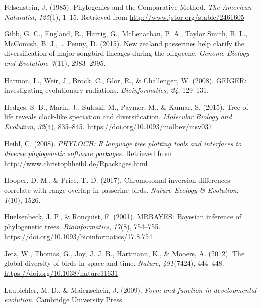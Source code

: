 \documentclass[
  english,
  man]{apa6}
\newlength{\cslhangindent}
\newlength{\cslentryspacingunit} %
\newenvironment{CSLReferences}[2] %
 {%
  \setlength{\parindent}{0pt}
  \ifodd #1
  \let\oldpar\par
  \def\par{\hangindent=\cslhangindent\oldpar}
  \fi
  \setlength{\parskip}{#2\cslentryspacingunit}
 }%
 {}
\begin{document}
\begin{CSLReferences}{1}{0}
\leavevmode{}%
Felsenstein, J. (1985). {Phylogenies and the Comparative Method}. \emph{The American Naturalist}, \emph{125}(1), 1--15. Retrieved from \url{http://www.jstor.org/stable/2461605}

\leavevmode{}%
Gibb, G. C., England, R., Hartig, G., McLenachan, P. A., Taylor Smith, B. L., McComish, B. J., \ldots{} Penny, D. (2015). New zealand passerines help clarify the diversification of major songbird lineages during the oligocene. \emph{{Genome Biology and Evolution}}, \emph{7}(11), 2983--2995.

\leavevmode{}%
Harmon, L., Weir, J., Brock, C., Glor, R., \& Challenger, W. (2008). {GEIGER: investigating evolutionary radiations}. \emph{Bioinformatics}, \emph{24}, 129--131.

\leavevmode{}%
Hedges, S. B., Marin, J., Suleski, M., Paymer, M., \& Kumar, S. (2015). {Tree of life reveals clock-like speciation and diversification}. \emph{{Molecular Biology and Evolution}}, \emph{32}(4), 835--845. \url{https://doi.org/10.1093/molbev/msv037}

\leavevmode{}%
Heibl, C. (2008). \emph{PHYLOCH: R language tree plotting tools and interfaces to diverse phylogenetic software packages.} Retrieved from \url{http://www.christophheibl.de/Rpackages.html}

\leavevmode{}%
Hooper, D. M., \& Price, T. D. (2017). Chromosomal inversion differences correlate with range overlap in passerine birds. \emph{Nature Ecology \& Evolution}, \emph{1}(10), 1526.

\leavevmode{}%
Huelsenbeck, J. P., \& Ronquist, F. (2001). {MRBAYES: Bayesian inference of phylogenetic trees}. \emph{Bioinformatics}, \emph{17}(8), 754--755. \url{https://doi.org/10.1093/bioinformatics/17.8.754}

\leavevmode{}%
Jetz, W., Thomas, G., Joy, J. J. B., Hartmann, K., \& Mooers, A. (2012). {The global diversity of birds in space and time}. \emph{Nature}, \emph{491}(7424), 444--448. \url{https://doi.org/10.1038/nature11631}

\leavevmode{}%
Laubichler, M. D., \& Maienschein, J. (2009). \emph{Form and function in developmental evolution}. Cambridge University Press.


\end{CSLReferences}
\end{document}
